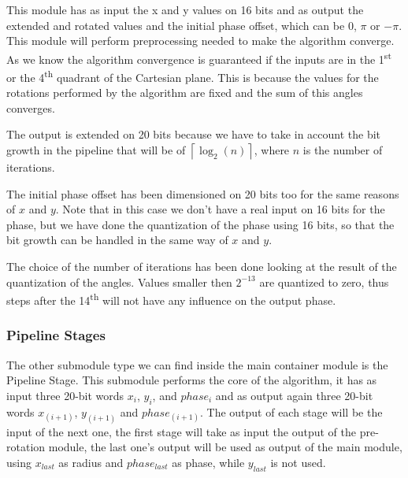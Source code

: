 This module has as input the x and y values on 16 bits and as output the
extended and rotated values and the initial phase offset, which can be \(0\),
\(\pi\) or \(-\pi\). This module will perform preprocessing needed to make the
algorithm converge. As we know the \cordic{} algorithm convergence is guaranteed
if the inputs are in the 1\textsuperscript{st} or the 4\textsuperscript{th}
quadrant of the Cartesian plane. This is because the values for the rotations
performed by the algorithm are fixed and the sum of this angles converges.

The output is extended on 20 bits because we have to take in account the bit
growth in the pipeline that will be of \(\left\lceil{\log_2(n)}\right\rceil\),
where \(n\) is the number of iterations.

The initial phase offset has been dimensioned on 20 bits too for the same
reasons of \(x\) and \(y\). Note that in this case we don't have a real input on
16 bits for the phase, but we have done the quantization of the phase using 16
bits, so that the bit growth can be handled in the same way of \(x\) and \(y\).

The choice of the number of iterations has been done looking at the result of
the quantization of the angles. Values smaller then \(2^{-13}\) are quantized to
zero, thus steps after the 14\textsuperscript{th} will not have any influence on
the output phase.

\subsubsection{Pipeline Stages}

The other submodule type we can find inside the main container module is the
Pipeline Stage. This submodule performs the core of the \cordic{} algorithm, it
has as input three 20-bit words \(x_i\), \(y_i\), and \(phase_i\) and as output
again three 20-bit words \(x_{(i+1)}\), \(y_{(i+1)}\) and \(phase_{(i+1)}\). The
output of each stage will be the input of the next one, the first stage will
take as input the output of the pre-rotation module, the last one's output will
be used as output of the main module, using \(x_{last}\) as radius and
\(phase_{last}\) as phase, while \(y_{last}\) is not used.
